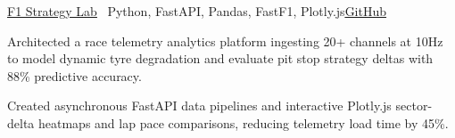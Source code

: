 \begin{cvproject}{\href{https://github.com/grvsnh/f1-strategy-lab}{\uline{F1 Strategy Lab}} \textbar\ Python, FastAPI, Pandas, FastF1, Plotly.js}{\href{https://github.com/grvsnh/f1-strategy-lab}{\uline{GitHub}}}
    \item Architected a race telemetry analytics platform ingesting 20+ channels at 10Hz to model dynamic tyre degradation and evaluate pit stop strategy deltas with 88\% predictive accuracy.
    \item Created asynchronous FastAPI data pipelines and interactive Plotly.js sector-delta heatmaps and lap pace comparisons, reducing telemetry load time by 45\%.
\end{cvproject}